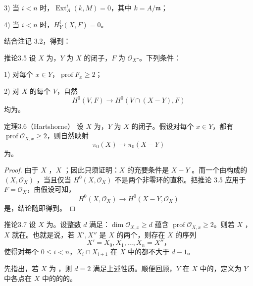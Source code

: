 3) 当 $i<n$ 时，$\operatorname{Ext}_A^i(k,M)=0$，其中 $k=A/\mathfrak m$；

4) 当 $i<n$ 时，$H_Y^i(X,F)=0$。

结合注记 3.2，得到：
\begin{SGAresult}{推论}{3.5}
设 $X$ 为，$Y$ 为 $X$ 的闭子，$F$ 为 $\mathcal O_X$-。下列条件：

1) 对每个 $x\in Y$，$\operatorname{prof}F_x\ge2$；

2) 对 $X$ 的每个 $V$，自然
\[
H^0(V,F)\longrightarrow H^0(V\cap(X-Y),F)
\]
均为。
\end{SGAresult}
\begin{SGAresult}{定理}{3.6（Hartshorne）}
设 $X$ 为，$Y$ 为 $X$ 的闭子。假设对每个 $x\in Y$，都有 $\operatorname{prof}\mathcal O_{X,x}\ge2$，则自然映射
\[
\pi_0(X)\longrightarrow\pi_0(X-Y)
\]
为。
\end{SGAresult}
\begin{proof}
由于 $X$ ，$X$ ；因此只须证明：$X$ 的充要条件是 $X-Y$ 。而一个由构成的 $(X,\mathcal O_X)$ ，当且仅当 $H^0(X,\mathcal O_X)$ 不是两个非零环的直积。把推论 3.5 应用于 $F=\mathcal O_X$，由假设可知，
\[
H^0(X,\mathcal O_X)\longrightarrow H^0(X-Y,\mathcal O_X)
\]
是，结论随即得到。
\end{proof}
\begin{SGAresult}{推论}{3.7}
设 $X$ 为。设整数 $d$ 满足：$\dim\mathcal O_{X,x}\ge d$ 蕴含 $\operatorname{prof}\mathcal O_{X,x}\ge2$。则若 $X$ ，$X$ 就在。也就是说，若 $X',X''$ 是 $X$ 的两个，则存在 $X$ 的序列
\[
X'=X_0,X_1,\ldots,X_n=X''，
\]
使得对每个 $0\le i<n$，$X_i\cap X_{i+1}$ 在 $X$ 中的都不大于 $d-1$。
\end{SGAresult}
先指出，若 $X$ 为 ，则 $d=2$ 满足上述性质。顺便回顾，$Y$ 在 $X$ 中的，定义为 $Y$ 中各点在 $X$ 中的的的。
